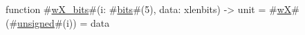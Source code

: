 function #\hyperref[sailRISCVzwXzybits]{wX\_bits}#(i: #\hyperref[sailRISCVzbits]{bits}#(5), data: xlenbits) -> unit = {
  #\hyperref[sailRISCVzwX]{wX}#(#\hyperref[sailRISCVzunsigned]{unsigned}#(i)) = data
}
